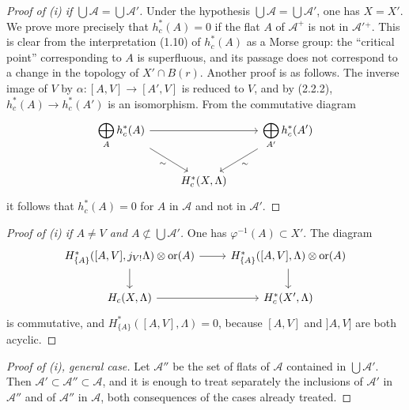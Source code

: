 \documentclass[11pt]{article}
\theoremstyle{definition}
\newcommand{\ornt}{\operatorname{or}}
\begin{document}
\begin{proof}[Proof of (i) if $\bigcup\mathcal A=\bigcup\mathcal A'$]
Under the hypothesis $\bigcup\mathcal A=\bigcup\mathcal A'$, one has $X=X'$.  We prove more precisely that $h_c^*(A)=0$ if the flat $A$ of $\mathcal A^+$ is not in $\mathcal A'{}^+$.  This is clear from the interpretation (1.10) of $h_c^*(A)$ as a Morse group: the ``critical point'' corresponding to $A$ is superfluous, and its passage does not correspond to a change in the topology of $X'\cap B(r)$.  Another proof is as follows.  The inverse image of $V$ by $\alpha:[A,V]\to[A',V]$ is reduced to $V$, and by (2.2.2), $h_c^*(A)\to h_c^*(A')$ is an isomorphism.  From the commutative diagram
\[
\begin{tikzcd}
\displaystyle\bigoplus_A h_c^*(A) \arrow[rr] \arrow[dr,"\sim"'] && \displaystyle\bigoplus_{A'} h_c^*(A') \arrow[dl,"\sim"]\\
& H_c^*(X,\Lambda) &
\end{tikzcd}
\]
it follows that $h_c^*(A)=0$ for $A$ in $\mathcal A$ and not in $\mathcal A'$.
\end{proof}

\begin{proof}[Proof of (i) if $A\neq V$ and $A\not\subset\bigcup\mathcal A'$]
One has $\varphi^{-1}(A)\subset X'$.  The diagram
\[
\begin{tikzcd}
H^*_{\{A\}}([A,V],j_{V!}\Lambda)\otimes\ornt(A) \arrow[r] \arrow[d] & H^*_{\{A\}}([A,V],\Lambda)\otimes\ornt(A) \arrow[d]\\
H_c(X,\Lambda) \arrow[r] & H_c^*(X',\Lambda)
\end{tikzcd}
\]
is commutative, and $H^*_{\{A\}}([A,V],\Lambda)=0$, because $[A,V]$ and $]A,V]$ are both acyclic.
\end{proof}

\begin{proof}[Proof of (i), general case]
Let $\mathcal A''$ be the set of flats of $\mathcal A$ contained in $\bigcup\mathcal A'$.  Then $\mathcal A'\subset\mathcal A''\subset\mathcal A$, and it is enough to treat separately the inclusions of $\mathcal A'$ in $\mathcal A''$ and of $\mathcal A''$ in $\mathcal A$, both consequences of the cases already treated.
\end{proof}
\end{document}
